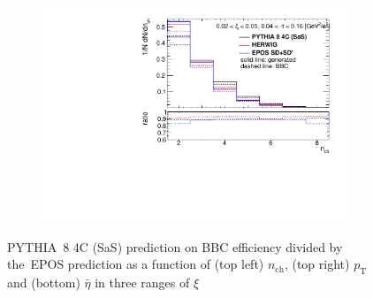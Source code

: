 \begin{figure}[t!]
\begin{subfigure}{.45\textwidth}
	\end{subfigure}
	\begin{subfigure}{.45\textwidth}
		\includegraphics[width=\textwidth,page=15]{chapters/chrgSTAR/img/bbcCorrection/xi_bbc.pdf}
	\end{subfigure}
	\begin{minipage}{.45\textwidth}
		\caption{PYTHIA~8 4C (SaS) prediction on BBC efficiency  divided by the~EPOS prediction as a function of (top left) $n_\textrm{ch}$, (top right) $p_\textrm{T}$ and (bottom)  $\bar{\eta}$ in three ranges of $\xi$}
		\label{fig:bbcCorection_syst_EPOS}
	\end{minipage}
	
\end{figure}

\FloatBarrier